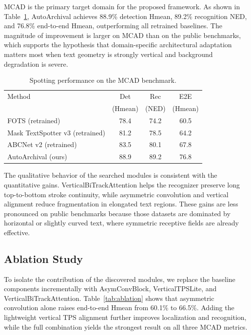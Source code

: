 \documentclass[a4paper,fleqn,longmktitle]{cas-sc}
\begin{document}
MCAD is the primary target domain for the proposed framework. As shown in Table~\ref{tab:mcad}, AutoArchival achieves 88.9\% detection Hmean, 89.2\% recognition NED, and 76.8\% end-to-end Hmean, outperforming all retrained baselines. The magnitude of improvement is larger on MCAD than on the public benchmarks, which supports the hypothesis that domain-specific architectural adaptation matters most when text geometry is strongly vertical and background degradation is severe.

\begin{table}[t]
\caption{Spotting performance on the MCAD benchmark.}
\label{tab:mcad}
\centering
\begin{tabular}{lccc}
\toprule
Method & Det & Rec & E2E \\
& (Hmean) & (NED) & (Hmean) \\
\midrule
FOTS (retrained) & 78.4 & 74.2 & 60.5 \\
Mask TextSpotter v3 (retrained) & 81.2 & 78.5 & 64.2 \\
ABCNet v2 (retrained) & 83.5 & 80.1 & 67.8 \\
AutoArchival (ours) & 88.9 & 89.2 & 76.8 \\
\bottomrule
\end{tabular}
\end{table}

The qualitative behavior of the searched modules is consistent with the quantitative gains. VerticalBiTrackAttention helps the recognizer preserve long top-to-bottom stroke continuity, while asymmetric convolution and vertical alignment reduce fragmentation in elongated text regions. These gains are less pronounced on public benchmarks because those datasets are dominated by horizontal or slightly curved text, where symmetric receptive fields are already effective.

\subsection{Ablation Study}

To isolate the contribution of the discovered modules, we replace the baseline components incrementally with AsymConvBlock, VerticalTPSLite, and VerticalBiTrackAttention. Table~\ref{tab:ablation} shows that asymmetric convolution alone raises end-to-end Hmean from 60.1\% to 66.5\%. Adding the lightweight vertical TPS alignment further improves localization and recognition, while the full combination yields the strongest result on all three MCAD metrics.
\end{document}

